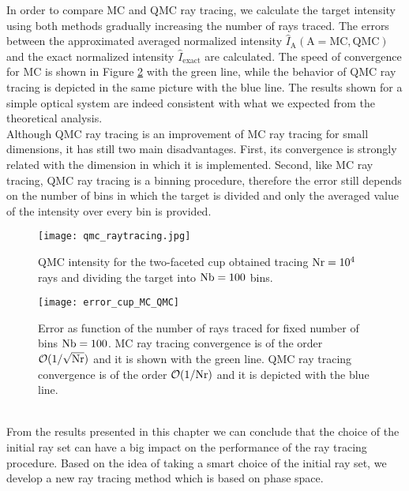 In order to compare MC and QMC ray tracing, we calculate the target intensity using both methods gradually increasing the number of rays traced. The errors between the approximated averaged normalized intensity $\hat{I}_{\textrm{A}} (\textrm{A} = \textrm{MC}, \textrm{QMC})$ and the exact normalized intensity $\hat{I}_\textrm{exact}$ are calculated.
The speed of convergence for MC is shown in Figure \ref{fig:Error_cup} with the green line, while the behavior of QMC ray tracing is depicted in the same picture with the blue line.
The results shown for a simple optical system are indeed consistent with what we expected from the theoretical analysis.
\\\indent Although QMC ray tracing is an improvement of MC ray tracing for small dimensions, it has still two main disadvantages. 
First, its convergence is strongly related with the dimension in which it is implemented.
Second, like MC ray tracing, QMC ray tracing is a binning procedure, therefore the error still depends on the number of bins in which the target is divided and only the averaged value of the intensity over every bin is provided.
\begin{figure}[t]
\begin{center}
    \texttt{[image: qmc\_raytracing.jpg]}
    \caption{QMC intensity for the two-faceted cup obtained tracing $\textrm{Nr}=10^4$ rays and dividing the target into $\textrm{Nb}=100$ bins.}
    \label{fig:qmc_intensity}
\end{center}
  \end{figure}
\begin{figure}[h]
\begin{center}
    \texttt{[image: error\_cup\_MC\_QMC]}
    \caption{Error as function of the number of rays traced for fixed number of bins $\textrm{Nb}=100$.
 MC ray tracing convergence is of the order $\mathcal{O}(1/\sqrt{\textrm{Nr}})$ and it is shown with the green line. 
QMC ray tracing convergence is of the order $\mathcal{O}(1/\textrm{Nr})$ and it is depicted with the blue line.}
    \label{fig:Error_cup}
\end{center}
  \end{figure}
 \\ \indent
From the results presented in this chapter we can conclude that the choice of the initial ray set can have a big impact on the performance of the ray tracing procedure. 
Based on the idea of taking a smart choice of the initial ray set, we develop a new ray tracing method which is based on phase space. 
